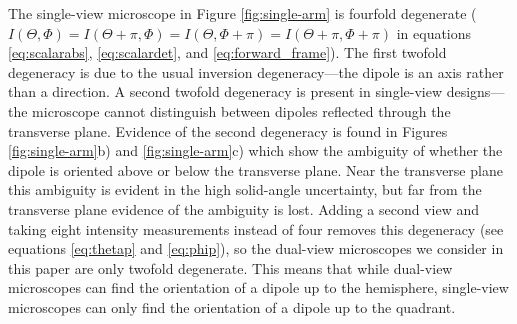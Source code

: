 \documentclass[10pt]{article}
\begin{document}
The single-view microscope in Figure \ref{fig:single-arm} is fourfold degenerate
($I(\Theta, \Phi) = I(\Theta + \pi, \Phi) = I(\Theta, \Phi + \pi) = I(\Theta +
\pi, \Phi+\pi)$ in equations \ref{eq:scalarabs}, \ref{eq:scalardet}, and
\ref{eq:forward_frame}). The first twofold degeneracy is due to the usual
inversion degeneracy---the dipole is an axis rather than a direction. A second
twofold degeneracy is present in single-view designs---the microscope cannot
distinguish between dipoles reflected through the transverse plane. Evidence of
the second degeneracy is found in Figures \ref{fig:single-arm}b) and
\ref{fig:single-arm}c) which show the ambiguity of whether the dipole is
oriented above or below the transverse plane. Near the transverse plane this
ambiguity is evident in the high solid-angle uncertainty, but far from the
transverse plane evidence of the ambiguity is lost. Adding a second view and
taking eight intensity measurements instead of four removes this degeneracy (see
equations \ref{eq:thetap} and \ref{eq:phip}), so the dual-view microscopes we
consider in this paper are only twofold degenerate. This means that while
dual-view microscopes can find the orientation of a dipole up to the
hemisphere, single-view microscopes can only find the orientation of a dipole
up to the quadrant.
\end{document}
